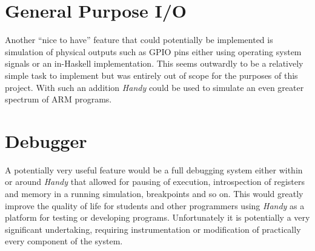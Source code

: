 
\section{General Purpose I/O}

Another ``nice to have'' feature that could potentially be implemented is simulation of physical outputs such as GPIO pins either using operating system signals or an in-Haskell implementation. This seems outwardly to be a relatively simple task to implement but was entirely out of scope for the purposes of this project. With such an addition \emph{Handy} could be used to simulate an even greater spectrum of ARM programs.


\section{Debugger}

A potentially very useful feature would be a full debugging system either within or around \emph{Handy} that allowed for pausing of execution, introspection of registers and memory in a running simulation, breakpoints and so on. This would greatly improve the quality of life for students and other programmers using \emph{Handy} as a platform for testing or developing programs. Unfortunately it is potentially a very significant undertaking, requiring instrumentation or modification of practically every component of the system.


